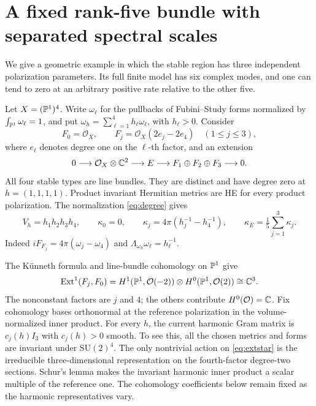 \section{A fixed rank-five bundle with separated spectral scales}\label{sec:example}

We give a geometric example in which the stable region has three
independent polarization parameters. Its full finite model has six
complex modes, and one can tend to zero at an arbitrary positive
rate relative to the other five.

Let $X=(\mathbb P^1)^4$. Write $\omega_\ell$ for the pullbacks of
Fubini--Study forms normalized by $\int_{\mathbb P^1}\omega_\ell=1$,
and put $\omega_h=\sum_{\ell=1}^4h_\ell\omega_\ell$, with
$h_\ell>0$. Consider
\begin{equation}\label{eq:linebundles}
F_0=\mathcal O_X,\qquad F_j=\mathcal O_X(2e_j-2e_4)\quad(1\le j\le3),
\end{equation}
where $e_\ell$ denotes degree one on the $\ell$-th factor, and
an extension
\begin{equation}\label{eq:star-extension}
0\longrightarrow\mathcal O_X\otimes\mathbb C^2\longrightarrow E
\longrightarrow F_1\oplus F_2\oplus F_3\longrightarrow0.
\end{equation}
All four stable types are line bundles. They are distinct and have
degree zero at $h=(1,1,1,1)$. Product invariant Hermitian metrics are
HE for every product polarization. The normalization
\eqref{eq:degree} gives
\begin{equation}\label{eq:linecurvature}
V_h=h_1h_2h_3h_4,\qquad\kappa_0=0,\qquad
\kappa_j=4\pi(h_j^{-1}-h_4^{-1}),\qquad
\kappa_E=\tfrac15\sum_{j=1}^3\kappa_j.
\end{equation}
Indeed $iF_{F_j}=4\pi(\omega_j-\omega_4)$ and
$\Lambda_{\omega_h}\omega_\ell=h_\ell^{-1}$.

The Künneth formula and line-bundle cohomology on $\mathbb P^1$ give
\begin{equation}\label{eq:extstar}
\operatorname{Ext}^1(F_j,F_0)=
H^1(\mathbb P^1,\mathcal O(-2))\otimes H^0(\mathbb P^1,\mathcal O(2))
\cong\mathbb C^3.
\end{equation}
The nonconstant factors are $j$ and $4$; the others contribute
$H^0(\mathcal O)=\mathbb C$. Fix cohomology bases orthonormal at the
reference polarization in the volume-normalized inner product.
For every $h$, the current harmonic Gram matrix is $c_j(h)I_3$
with $c_j(h)>0$ smooth. To see this, all the chosen metrics and
forms are invariant under $\mathrm{SU}(2)^4$. The only nontrivial
action on \eqref{eq:extstar} is the irreducible three-dimensional
representation on the fourth-factor degree-two sections.
Schur's lemma makes the invariant harmonic inner product a scalar
multiple of the reference one. The cohomology coefficients below
remain fixed as the harmonic representatives vary.

